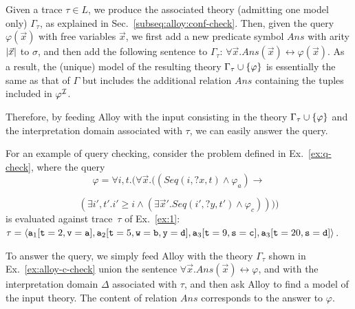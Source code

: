 Given a trace $\tau\in L$, we produce the associated theory
(admitting one model only) $\Gamma_\tau$, as explained in
Sec.~\ref{subseq:alloy:conf-check}. Then, given the
query $\varphi(\vec x)$ with free variables
$\vec x$, we first add a new predicate symbol $Ans$
with arity $|{\vec x}|$ to $\sigma$, and then
add the following sentence to $\Gamma_\tau$:
$\forall \vec x.Ans(\vec x)\leftrightarrow \varphi(\vec x)$.
As a result, the (unique) model of the resulting theory
$\Gamma_\tau\cup\{\varphi\}$ is essentially the
same as that of $\Gamma$ but includes the additional relation
$Ans$ containing the tuples included in $\varphi^{\mathcal{I}}$.

Therefore, by feeding Alloy with the input consisting in
the theory $\Gamma_\tau\cup\{\varphi\}$ and the
interpretation domain associated with $\tau$, we can easily
answer the query.

\begin{example}
For an example of query checking, consider the problem
defined in Ex.~\ref{ex:q-check}, where the query
$$\varphi=\forall i,t.(
			\forall\vec x.(
				(Seq(i,?x,t)\land \varphi_a)
					\rightarrow
$$

\vspace{-5mm}
$$
				(\exists i',t'.i'\geq i\land(
					\exists\vec x'.
						Seq(i',?y,t')\land\varphi_c)
				)
			)
		)
		$$
is evaluated against
trace~$\tau$ of Ex.~\ref{ex:1}:
$\tau=\langle\mathtt{a}_1[
	\mathtt{t}=2,
	\mathtt{v}=\mathtt{a}
],
\mathtt{a}_2[
	\mathtt{t}=5,
	\mathtt{w}=\mathtt{b},
	\mathtt{y}=\mathtt{d}
],
\mathtt{a}_3[
	\mathtt{t}=9,
	\mathtt{s}=\mathtt{c}
],
\mathtt{a}_3[
	\mathtt{t}=20,
	\mathtt{s}=\mathtt{d}
]\rangle$.

To answer the query, we simply feed Alloy with the theory
$\Gamma_\tau$ shown in Ex.~\ref{ex:alloy-c-check}
union the sentence
$\forall \vec x.Ans(\vec x)\leftrightarrow \varphi$,
and with the interpretation domain $\Delta$ associated with
$\tau$, and then ask Alloy to find a model of the
input theory.
The content of relation $Ans$ corresponds to the answer to
$\varphi$.
\end{example}


